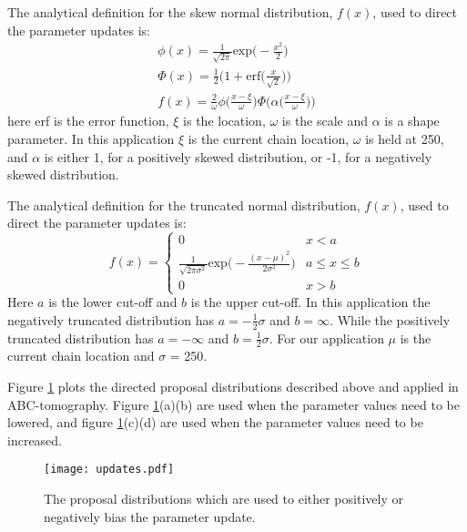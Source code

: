 The analytical definition for the skew normal distribution, $f(x)$, used to direct the parameter updates is:
\begin{equation}
\begin{split}
\phi(x) = \frac{1}{\sqrt{2\pi}}\text{exp}\Big(-\frac{x^2}{2}\Big) \\
\Phi(x) = \frac{1}{2}\bigg(1 + \text{erf}\Big(\frac{x}{\sqrt{2}}\Big)\bigg)\\
f(x) = \frac{2}{\omega} \phi\bigg(\frac{x-\xi}{\omega}\bigg)\Phi\bigg(\alpha \Big(\frac{x-\xi}{\omega}\Big)\bigg)
\end{split}
\label{skew-normal-dist}
\end{equation}
here erf is the error function, $\xi$ is the location, $\omega$ is the scale and $\alpha$ is a shape parameter. In this application  $\xi$ is the current chain location, $\omega$ is held at 250, and $\alpha$ is either 1, for a positively skewed distribution, or -1, for a negatively skewed distribution. \par
The analytical definition for the truncated normal distribution, $f(x)$, used to direct the parameter updates is:
\begin{equation}
	f(x) = \begin{cases} 
	0 & x < a \\
	\frac{1}{\sqrt{2\pi\sigma^2}}\text{exp}\Big(-\frac{(x-\mu)^2}{2\sigma^2}\Big) & a\leq x\leq b \\
	0 & x > b 
	\end{cases}
\end{equation}
Here $a$ is the lower cut-off and $b$ is the upper cut-off. In this application the negatively truncated distribution has $a = -\frac{1}{2}\sigma$ and $b = \infty$. While the positively truncated distribution has $a = -\infty$ and $b = \frac{1}{2}\sigma$. For our application $\mu$ is the current chain location and $\sigma$ = 250. \par
Figure \ref{updates} plots the directed proposal distributions described above and applied in ABC-tomography. Figure \ref{updates}(a)(b) are used when the parameter values need to be lowered, and figure \ref{updates}(c)(d) are used when the parameter values need to be increased. 

\begin{figure}[H]
	\centering
	\texttt{[image: updates.pdf]}
	\caption{The proposal distributions which are used to either positively or negatively bias the parameter update.}
	\label{updates}
\end{figure}

